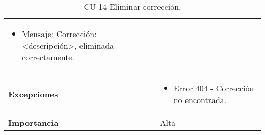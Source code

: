 \begin{table}[p]
\begin{tabularx}{\linewidth}{ p{} p{} }
\begin{itemize}
		                                  \item Mensaje: Corrección: <descripción>, eliminada correctamente.
		                                 \end{itemize} \\
		\textbf{Excepciones}         & \begin{itemize}
                                        \tightlist
		                                  \item Error 404 - Corrección no encontrada.
		                                 \end{itemize} \\
		\textbf{Importancia}          & Alta \\
		\bottomrule
	\end{tabularx}
	\caption{CU-14 Eliminar corrección.}
	\label{tab:CU-14}
\end{table}


